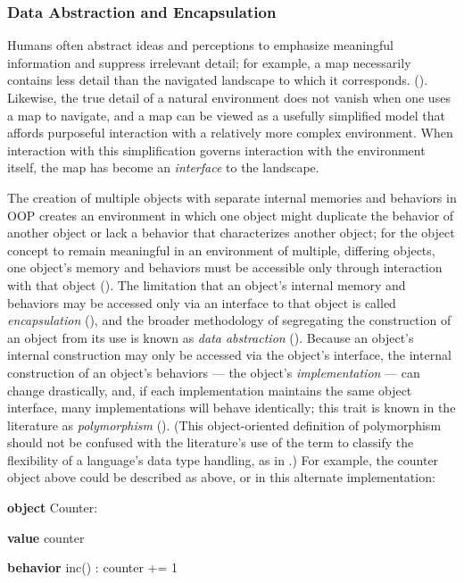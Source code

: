 \subsubsection{Data Abstraction and Encapsulation}
Humans often abstract ideas and perceptions to emphasize meaningful information and suppress irrelevant detail; for example, a map necessarily contains less detail than the navigated landscape to which it corresponds. (\cite[3]{Wirfs-Brock:1990ys}). Likewise, the true detail of a natural environment does not vanish when one uses a map to navigate, and a map can be viewed as a usefully simplified model that affords purposeful interaction with a relatively more complex environment. When interaction with this simplification governs interaction with the environment itself, the map has become an \emph{interface} to the landscape.

The creation of multiple objects with separate internal memories and behaviors in OOP creates an environment in which one object might duplicate the behavior of another object or lack a behavior that characterizes another object; for the object concept to remain meaningful in an environment of multiple, differing objects, one object's memory and behaviors must be accessible only through interaction with that object (\cite[481]{Cardelli:1985oq}). The limitation that an object's internal memory and behaviors may be accessed only via an interface to that object is called \emph{encapsulation} (\cite[18]{Van-Roy:2004uq}), and the broader methodology of segregating the construction of an object from its use is known as \emph{data abstraction} (\cite{Abelson:1983nx}). Because an object's internal construction may only be accessed via the object's interface, the internal construction of an object's behaviors --- the object's \emph{implementation} --- can change drastically, and, if each implementation maintains the same object interface, many implementations will behave identically; this trait is known in the literature as \emph{polymorphism} (\cite[18]{Van-Roy:2004uq}). (This object-oriented definition of polymorphism should not be confused with the literature's use of the term to classify the flexibility of a language's data type handling, as in \cite[472-480]{Cardelli:1985oq}.) For example, the counter object above could be described as above, or in this alternate implementation:

\begin{ttfamily}
\begin{scriptsize}
\textbf{object} Counter:

   \textbf{value} counter

   \textbf{behavior} inc() : counter += 1
\end{scriptsize}
\end{ttfamily}

